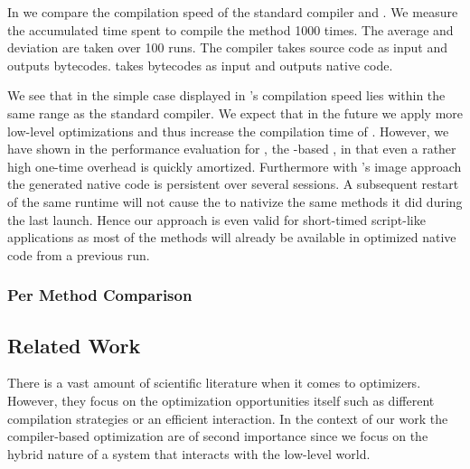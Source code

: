 \noindent In  we compare the compilation speed of the standard \PH compiler and \NBJ.
We measure the accumulated time spent to compile the method 1000 times.
The average and deviation are taken over 100 runs. 
The \PH compiler takes source code as input and outputs \ST bytecodes.
\NBJ takes bytecodes as input and outputs native code.

We see that in the simple case displayed in  \NBJ's compilation speed lies within the same range as the standard \ST compiler.
We expect that in the future we apply more low-level optimizations and thus increase the compilation time of \NBJ.
However, we have shown in the performance evaluation for \NB, the \B-based \FFI, in  that even a rather high one-time overhead is quickly amortized.
Furthermore with \ST's image approach the generated native code is persistent over several sessions.
A subsequent restart of the same runtime will not cause the \JIT to nativize the same methods it did during the last launch.
Hence our approach is even valid for short-timed script-like applications as most of the methods will already be available in optimized native code from a previous run.

\subsubsection*{Per Method Comparison}


\subsection{Related Work}
There is a vast amount of scientific literature when it comes to \JIT optimizers.
However, they focus on the optimization opportunities itself such as different compilation strategies or an efficient \GC interaction.
In the context of our work the compiler-based optimization are of second importance since we focus on the hybrid nature of a system that interacts with the low-level \VM world.

